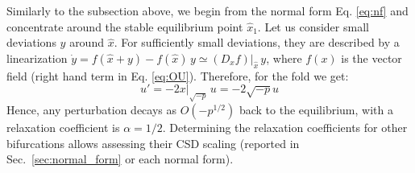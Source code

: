 Similarly to the subsection above, we begin from the normal form Eq. \ref{eq:nf} and concentrate around the stable equilibrium point $\hat{x}_1$. Let us consider small deviations $y$ around $\hat{x}$. For sufficiently small deviations, they are described by a linearization $\dot{y} = f(\hat{x}+y)-f(\hat{x}) \, y \simeq (D_x f)|_{\hat{x}} \, y$, where $f(x)$ is the vector field (right hand term in Eq. \ref{eq:OU}). Therefore, for the fold we get:
\begin{equation}
	u' = -2x|_{\sqrt{-p}} \, u= -2\sqrt{-p}u
\end{equation}
Hence, any perturbation decays as $O(-p^{1/2})$ back to the equilibrium, with a relaxation coefficient is $\alpha = 1/2$. Determining the relaxation coefficients for other bifurcations allows assessing their CSD scaling (reported in Sec.~\ref{sec:normal_form} or each normal form). \\


